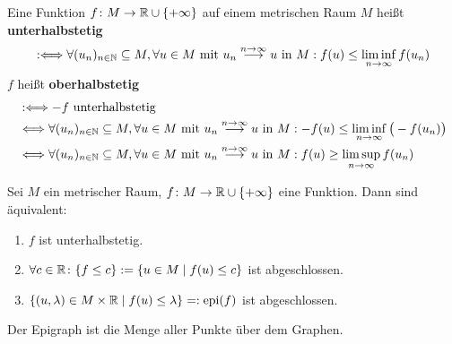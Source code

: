 \begin{definition}
	Eine Funktion $f\colon M\to\mathbb{R}\cup\lbrace+\infty\rbrace$ auf einem metrischen Raum $M$ heißt \textbf{unterhalbstetig}
	\begin{align*}
		:\Longleftrightarrow
		\forall(u_n)_{n\in\mathbb{N}}\subseteq M,\forall u\in M\text{ mit }
		u_n\stackrel{n\to\infty}{\longrightarrow} u\text{ in }M:
		f(u)\leq\liminf_{n\to\infty} f(u_n)
	\end{align*}
	$f$ heißt \textbf{oberhalbstetig}
	\begin{align*}
		&:\Longleftrightarrow -f\text{ unterhalbstetig}\\
		&\Longleftrightarrow
		\forall(u_n)_{n\in\mathbb{N}}\subseteq M,\forall u\in M\text{ mit }
		u_n\stackrel{n\to\infty}{\longrightarrow} u\text{ in }M:
		-f(u)\leq\liminf\limits_{n\to\infty}\big(-f(u_n)\big)\\
		&\Longleftrightarrow
		\forall(u_n)_{n\in\mathbb{N}}\subseteq M,\forall u\in M\text{ mit }
		u_n\stackrel{n\to\infty}{\longrightarrow} u\text{ in }M:
		f(u)\geq\limsup\limits_{n\to\infty} f(u_n)
	\end{align*}
\end{definition}

\begin{lemma}
	Sei $M$ ein metrischer Raum, $f\colon M\to\mathbb{R}\cup\lbrace+\infty\rbrace$ eine Funktion. 
	Dann sind äquivalent: 
	\begin{enumerate}[label=(\roman*)]
		\item $f$ ist unterhalbstetig.
		\item $\forall c\in\mathbb{R}\colon\lbrace f\leq c\rbrace:=\lbrace u\in M\mid f(u)\leq c\rbrace$ ist abgeschlossen.
		\item $\lbrace(u,\lambda)\in M\times\mathbb{R}\mid f(u)\leq\lambda\rbrace=:\operatorname{epi}(f)$ ist abgeschlossen.
	\end{enumerate}
\end{lemma}

\begin{bemerkung}
	Der Epigraph ist die Menge aller Punkte über dem Graphen.
\end{bemerkung}

